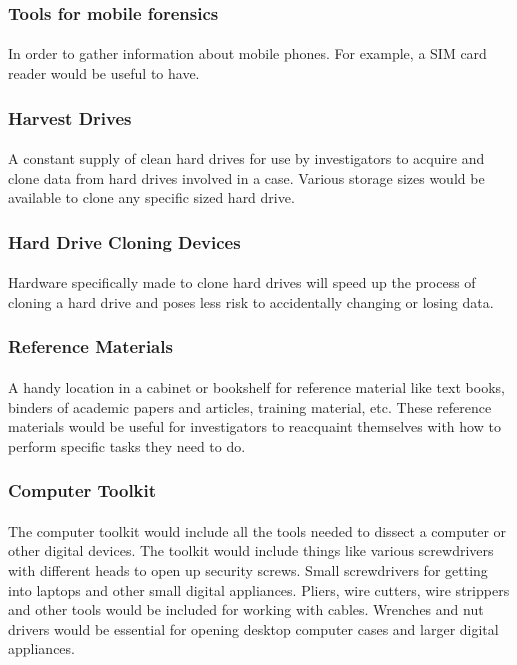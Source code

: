 \documentclass[12pt]{article}
\begin{document}
\subsubsection{Tools for mobile forensics}
\paragraph{}
In order to gather information about mobile phones. For example, a SIM card reader would be useful to have.
\subsubsection{Harvest Drives}
\paragraph{}
A constant supply of clean hard drives for use by investigators to acquire and clone data from hard drives involved in a case.
Various storage sizes would be available to clone any specific sized hard drive.
\cite[p.~128]{hayes}
\subsubsection{Hard Drive Cloning Devices}
\paragraph{}
Hardware specifically made to clone hard drives will speed up the process of cloning a hard drive and poses less risk to accidentally changing or losing data.
\subsubsection{Reference Materials}
\paragraph{}
A handy location in a cabinet or bookshelf for reference material like text books, binders of academic papers and articles, training material, etc.
These reference materials would be useful for investigators to reacquaint themselves with how to perform specific tasks they need to do.
\cite[p.~124]{hayes}
\subsubsection{Computer Toolkit}
\paragraph{}
The computer toolkit would include all the tools needed to dissect a computer or other digital devices.
The toolkit would include things like various screwdrivers with different heads to open up security screws. 
Small screwdrivers for getting into laptops and other small digital appliances. 
Pliers, wire cutters, wire strippers and other tools would be included for working with cables. 
Wrenches and nut drivers would be essential for opening desktop computer cases and larger digital appliances. 
\cite[p.~129]{hayes}
\end{document}
